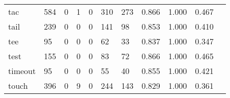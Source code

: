 \begin{longtable}{lp{1.2cm}p{1.2cm}p{1.2cm}p{1.2cm}p{1.2cm}p{1.2cm}p{1.2cm}p{1.2cm}p{1.2cm}p{1.2cm}}
tac       &                                   584 &                                                  0 &                                                  1 &                                                  0 &                                                310 &                                                273 &                                              0.866 &                                              1.000 &                                              0.467 \\
tail      &                                   239 &                                                  0 &                                                  0 &                                                  0 &                                                141 &                                                 98 &                                              0.853 &                                              1.000 &                                              0.410 \\
tee       &                                    95 &                                                  0 &                                                  0 &                                                  0 &                                                 62 &                                                 33 &                                              0.837 &                                              1.000 &                                              0.347 \\
test      &                                   155 &                                                  0 &                                                  0 &                                                  0 &                                                 83 &                                                 72 &                                              0.866 &                                              1.000 &                                              0.465 \\
timeout   &                                    95 &                                                  0 &                                                  0 &                                                  0 &                                                 55 &                                                 40 &                                              0.855 &                                              1.000 &                                              0.421 \\
touch     &                                   396 &                                                  0 &                                                  9 &                                                  0 &                                                244 &                                                143 &                                              0.829 &                                              1.000 &                                              0.361 \\

\end{longtable}
